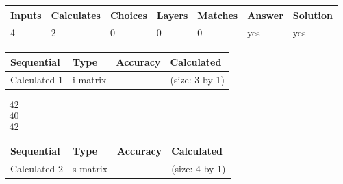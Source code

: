 \documentclass[12pt]{article}
\begin{document}
 
 
\noindent{}
 
 

 
 
 
\noindent{}
 
 

 
 
\noindent{}
 
 

 
\vspace{0.3in}
   
   
   
   
\noindent\begin{tabular}{|l|l|l|l|l|l|l|}
 \hline
Inputs & Calculates & Choices & Layers & Matches & Answer & Solution \\ \hline
           4 & 
           2 & 
           0
  & 
           0 & 
           0 & 
  yes & 
  yes 
  \\ \hline
 \end{tabular}
   
   
   
   
\noindent{}
   
   
  
  
\noindent\begin{tabular}{|l|l|l|l|}
\hline
 Sequential & Type & Accuracy & Calculated \\ 
\hline
 
 
  Calculated $           1$ & i-matrix &  & 
 (size:           3 by           1)
 \\  \hline  
 \end{tabular}
   
   
$\begin{array}{
 c
 }
          42 \\ 
          40 \\ 
          42
 \end{array}  $ 
  
  
\noindent\begin{tabular}{|l|l|l|l|}
\hline
 Sequential & Type & Accuracy & Calculated \\ 
\hline
 
 
  Calculated $           2$ & s-matrix & & 
 (size:           4 by           1)
 \\  \hline  
 \end{tabular}
   
\end{document}

